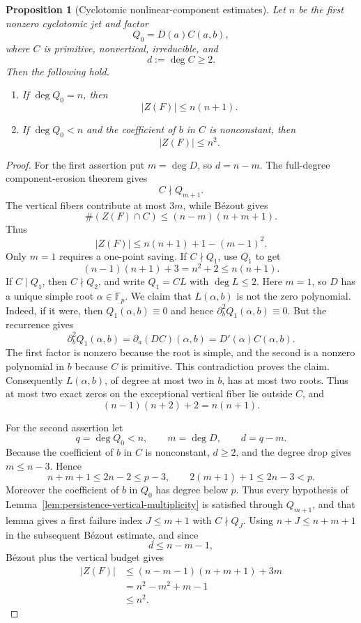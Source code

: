 \documentclass[11pt]{article}
\newtheorem{proposition}[theorem]{Proposition}
\newcommand{\F}{\mathbb F}
\begin{document}
\begin{proposition}[Cyclotomic nonlinear-component estimates]
\label{prop:cyclotomic-nonlinear-estimates}
Let \(n\) be the first nonzero cyclotomic jet and factor
\[
 Q_0=D(a)C(a,b),
\]
where \(C\) is primitive, nonvertical, irreducible, and
\[
 d:=\deg C\ge2.
\]
Then the following hold.

\begin{enumerate}
\item If \(\deg Q_0=n\), then
\[
 |Z(F)|\le n(n+1).
\]

\item If \(\deg Q_0<n\) and the coefficient of \(b\) in \(C\) is
nonconstant, then
\[
 |Z(F)|\le n^2.
\]
\end{enumerate}
\end{proposition}

\begin{proof}
For the first assertion put \(m=\deg D\), so \(d=n-m\).
The full-degree component-erosion theorem gives
\[
 C\nmid Q_{m+1}.
\]
The vertical fibers contribute at most \(3m\), while B\'ezout gives
\[
 \#(Z(F)\cap C)\le(n-m)(n+m+1).
\]
Thus
\[
 |Z(F)|
 \le
 n(n+1)+1-(m-1)^2.
\]
Only \(m=1\) requires a one-point saving.
If \(C\nmid Q_1\), use \(Q_1\) to get
\[
 (n-1)(n+1)+3=n^2+2\le n(n+1).
\]
If \(C\mid Q_1\), then \(C\nmid Q_2\), and write \(Q_1=CL\) with
\(\deg L\le2\).  Here \(m=1\), so \(D\) has a unique simple root
\(\alpha\in\F_p\).  We claim that \(L(\alpha,b)\) is not the zero
polynomial.  Indeed, if it were, then \(Q_1(\alpha,b)\equiv0\) and hence
\(\partial_b^2Q_1(\alpha,b)\equiv0\).  But the recurrence gives
\[
 \partial_b^2Q_1(\alpha,b)
 =\partial_a(DC)(\alpha,b)
 =D'(\alpha)C(\alpha,b).
\]
The first factor is nonzero because the root is simple, and the second is a
nonzero polynomial in \(b\) because \(C\) is primitive.  This contradiction
proves the claim.  Consequently \(L(\alpha,b)\), of degree at most two in
\(b\), has at most two roots.  Thus at most two exact zeros on the exceptional
vertical fiber lie outside \(C\), and
\[
 (n-1)(n+2)+2=n(n+1).
\]

For the second assertion let
\[
 q=\deg Q_0<n,\qquad m=\deg D,\qquad d=q-m.
\]
Because the coefficient of \(b\) in \(C\) is nonconstant, \(d\ge2\),
and the degree drop gives \(m\le n-3\).  Hence
\[
 n+m+1\le2n-2\le p-3,
 \qquad
 2(m+1)+1\le2n-3<p.
\]
Moreover the coefficient of \(b\) in \(Q_0\) has degree below \(p\).
Thus every hypothesis of
Lemma~\ref{lem:persistence-vertical-multiplicity} is satisfied through
\(Q_{m+1}\), and that lemma gives a first failure index
\(J\le m+1\) with \(C\nmid Q_J\).  Using
\(n+J\le n+m+1\) in the subsequent B\'ezout estimate, and since
\[
 d\le n-m-1,
\]
B\'ezout plus the vertical budget gives
\[
 \begin{aligned}
 |Z(F)|
 &\le
 (n-m-1)(n+m+1)+3m\\
 &=n^2-m^2+m-1\\
 &\le n^2.
 \end{aligned}
\]
\end{proof}
\end{document}

